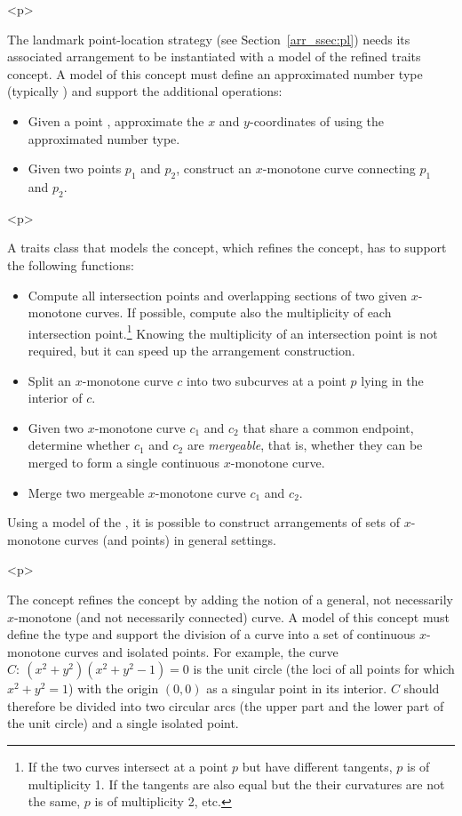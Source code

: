 \begin{ccHtmlOnly}<p>\end{ccHtmlOnly}
The landmark point-location strategy (see
Section~\ref{arr_ssec:pl}) needs its associated arrangement to be
instantiated with a model of the refined
 traits concept. A model of this
concept must define an approximated number type (typically
) and support the additional operations:
\begin{itemize}
\item Given a point , approximate the $x$ and $y$-coordinates
of  using the approximated number type.
\item Given two points $p_1$ and $p_2$, construct an $x$-monotone
curve connecting $p_1$ and $p_2$.
\end{itemize}

\begin{ccHtmlOnly}<p>\end{ccHtmlOnly}
A traits class that models the 
concept, which refines the 
concept, has to support the following functions:
\begin{itemize}
\item Compute all intersection points and overlapping sections of
two given $x$-monotone curves. If possible, compute also the
multiplicity of each intersection point.\footnote{If the two
curves intersect at a point $p$ but have different tangents, $p$
is of multiplicity 1. If the tangents are also equal but the their
curvatures are not the same, $p$ is of multiplicity 2, etc.}
Knowing the multiplicity of an intersection point is not required,
but it can speed up the arrangement construction.
\item Split an $x$-monotone curve $c$ into two subcurves at a point
$p$ lying in the interior of $c$.
\item Given two $x$-monotone curve $c_1$ and $c_2$ that share a
common endpoint, determine whether $c_1$ and $c_2$ are {\em
mergeable}, that is, whether they can be merged to form a
single continuous $x$-monotone curve.
\item Merge two mergeable $x$-monotone curve $c_1$ and $c_2$.
\end{itemize}
Using a model of the , it is
possible to construct arrangements of sets of $x$-monotone curves
(and points) in general settings.

\begin{ccHtmlOnly}<p>\end{ccHtmlOnly}
The concept  refines the
 concept by adding the notion
of a general, not necessarily $x$-monotone (and not necessarily
connected) curve. A model of this concept must define the
 type and support the division of a curve into a
set of continuous $x$-monotone curves and isolated points. For
example, the curve $C:\ (x^2 + y^2)(x^2 + y^2 - 1) = 0$ is the
unit circle (the loci of all points for which $x^2 + y^2  = 1$)
with the origin $(0,0)$ as a singular point in its interior. $C$
should therefore be divided into two circular arcs (the upper
part and the lower part of the unit circle) and a single isolated
point.

